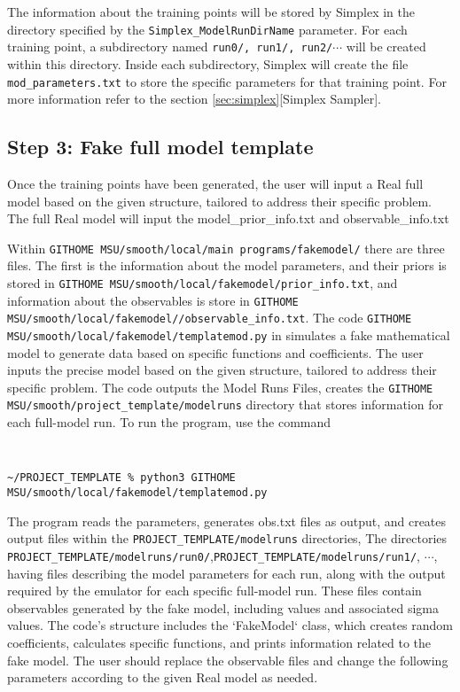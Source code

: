 \documentclass[main.tex]{subfiles}
\begin{document}
The information about the training points will be stored by Simplex in the directory specified by the {\tt Simplex\_ModelRunDirName} parameter. For each training point, a subdirectory named {\tt run0/, run1/, run2/}$\cdots$ will be created within this directory. Inside each subdirectory, Simplex will create the file {\tt mod\_parameters.txt} to store the specific parameters for that training point. For more information refer to the section \ref{sec:simplex}[Simplex Sampler].


\subsection{Step 3: Fake full model template}
Once the training points have been generated, the user will input a Real full model based on the given structure, tailored to address their specific problem. The full Real model will input the model\_prior\_info.txt and observable\_info.txt

Within {\tt GITHOME MSU/smooth/local/main programs/fakemodel/} there are three files. The first is the information about the model parameters, and their priors is stored in {\tt GITHOME MSU/smooth/local/fakemodel/prior\_info.txt}, and information about the observables is store in {\tt GITHOME MSU/smooth/local/fakemodel//observable\_info.txt}. The code
{\tt GITHOME MSU/smooth/local/fakemodel/templatemod.py} in simulates a fake mathematical model to generate data based on specific functions and coefficients. The user inputs the precise model based on the given structure, tailored to address their specific problem. The code outputs the Model Runs Files, creates the {\tt GITHOME MSU/smooth/project\_template/modelruns} directory that stores information for each full-model run.
To run the program, use the command\

\vspace{-20pt}
{\tt
\begin{verbatim}
~/PROJECT_TEMPLATE % python3 GITHOME MSU/smooth/local/fakemodel/templatemod.py
\end{verbatim}
}
The program reads the parameters, generates obs.txt files as output, and creates output files within the {\tt PROJECT\_TEMPLATE/modelruns} directories, The directories
{\tt  PROJECT\_TEMPLATE/modelruns/run0/},{\tt  PROJECT\_TEMPLATE/modelruns/run1/}, $\cdots$, having files describing the model parameters for each run, along with the output required by the emulator for each specific full-model run. These files contain observables generated by the fake model, including values and associated sigma values. The code's structure includes the `FakeModel` class, which creates random coefficients, calculates specific functions, and prints information related to the fake model. The user should replace the observable files and change the following parameters according to the given Real model as needed.
\end{document}
